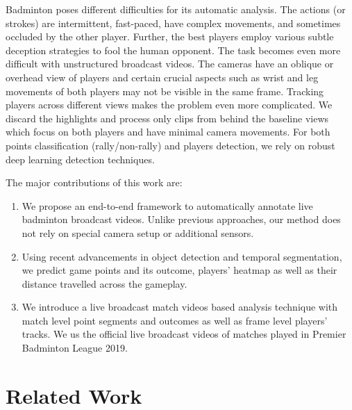 \documentclass[runningheads,a4paper]{llncs}
\begin{document}
Badminton poses different difficulties for its automatic analysis. The actions (or  strokes) are  intermittent, fast-paced, have complex movements, and sometimes occluded by the other player.  Further, the best players employ various subtle deception strategies to fool the human opponent. The task becomes even more difficult with unstructured broadcast videos. The cameras have an oblique or overhead view of players and certain crucial aspects such as wrist and leg movements of both players may not be visible in the same frame. Tracking players across different views makes the problem even more complicated. We discard the highlights and process only clips from behind the baseline views which focus on both players and have minimal camera movements. For both points classification (rally/non-rally) and players detection, we rely on robust deep learning detection techniques. \par
The major contributions of this work are:

\begin{enumerate}[topsep=8pt,itemsep=4pt,partopsep=4pt, parsep=4pt]
    \item We propose an end-to-end framework to automatically annotate live badminton broadcast videos. Unlike previous approaches, our method does not rely on special camera setup or additional sensors.
    
    \item Using recent  advancements in object detection and temporal segmentation, we predict game points and its outcome, players' heatmap as well as their distance travelled across the gameplay.
    
    \item We introduce a live broadcast match videos based analysis technique with match level point segments and outcomes as well as frame level players' tracks. We us the official live broadcast videos of matches played in Premier Badminton League 2019.
\end{enumerate}

\section{Related Work}
\end{document}

